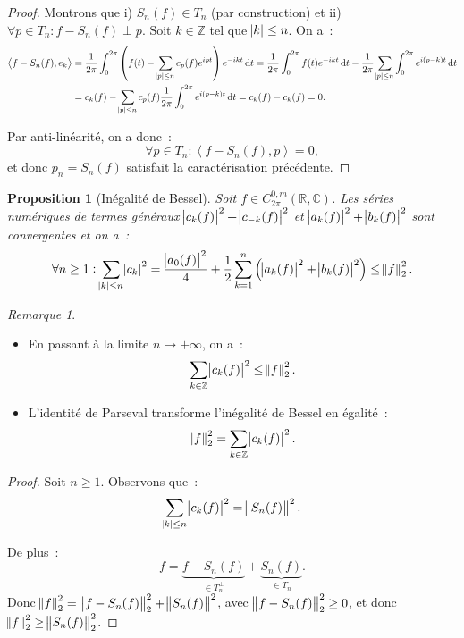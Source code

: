 \documentclass{report}
\newtheorem{prp}[thm]{Proposition}
\theoremstyle{definition}
\theoremstyle{remark}
\newtheorem*{rmq}{Remarque}
\numberwithin{equation}{section}
\newcommand{\C}{\mathbb C}
\newcommand{\R}{\mathbb R}
\newcommand{\Z}{\mathbb Z}
\newcommand{\scpr}[2]{\left\langle #1, #2\right\rangle}
\newcommand{\pinfty}{{+\infty}}
\newcommand{\CmT}[2]{C^{#1,m}_{#2}}
\newcommand{\CzmT}[1]{\CmT 0{#1}}
\newcommand{\Czm}{\CzmT{2\pi}}
\begin{document}
			\begin{proof} Montrons que i) $S_n(f) \in T_n$ (par construction) et ii) $\forall p \in T_n : f-S_n(f) \perp p$. Soit $k \in \Z$ tel que
			$\abs k \leq n$. On a~:
			\begin{align}
				\scpr {f-S_n(f)}{e_k} &= \frac 1{2\pi}\int_0^{2\pi}\left(f(t) - \sum_{\abs p \leq n}c_p(f)e^{ipt}\right)e^{-ikt}\dif t
						= \frac 1{2\pi}\int_0^{2\pi}f(t)e^{-ikt}\dif t - \frac 1{2\pi}\sum_{\abs p \leq n}\int_0^{2\pi}e^{i(p-k)t}\dif t \\
					&= c_k(f) - \sum_{\abs p \leq n}c_p(f)\frac 1{2\pi}\int_0^{2\pi}e^{i(p-k)t}\dif t = c_k(f) - c_k(f) = 0.
			\end{align}

			Par anti-linéarité, on a donc~:
			\begin{equation}
				\forall p \in T_n : \scpr {f-S_n(f)}p = 0,
			\end{equation}
			et donc $p_n = S_n(f)$ satisfait la caractérisation précédente.
			\end{proof}

			\begin{prp}[Inégalité de Bessel] Soit $f \in \Czm(\R, \C)$. Les séries numériques de termes généraux $\abs {c_k(f)}^2 + \abs {c_{-k}(f)}^2$
			et $\abs {a_k(f)}^2 + \abs {b_k(f)}^2$ sont convergentes et on a~:
			\begin{equation}
				\forall n \geq 1 : \sum_{\abs k \leq n}\abs {c_k}^2 = \frac {\abs {a_0(f)}^2}4 + \frac 12\sum_{k=1}^n\left(\abs {a_k(f)}^2 + \abs {b_k(f)}^2\right) \leq \norm f_2^2.
			\end{equation}
			\end{prp}

			\begin{rmq}~
				\begin{itemize}
					\item En passant à la limite $n \to \pinfty$, on a~:
					\begin{equation}
						\sum_{k \in \Z}\abs {c_k(f)}^2 \leq \norm f_2^2.
					\end{equation}
					\item L'identité de Parseval transforme l'inégalité de Bessel en égalité~:
					\begin{equation}
						\norm f_2^2 = \sum_{k \in \Z}\abs {c_k(f)}^2.
					\end{equation}
				\end{itemize}
			\end{rmq}

			\begin{proof} Soit $n \geq 1$. Observons que~:
			\begin{equation}
				\sum_{\abs k \leq n}\abs {c_k(f)}^2 = \norm {S_n(f)}^2.
			\end{equation}

			De plus~:
			\begin{equation}
				f = \underbrace {f - S_n(f)}_{\in T_n^\perp} + \underbrace {S_n(f)}_{\in T_n}.
			\end{equation}
			Donc $\norm f_2^2 = \norm {f-S_n(f)}_2^2 + \norm {S_n(f)}^2$, avec $\norm {f - S_n(f)}_2^2 \geq 0$, et donc $\norm f_2^2 \geq \norm {S_n(f)}_2^2$.
			\end{proof}
\end{document}
